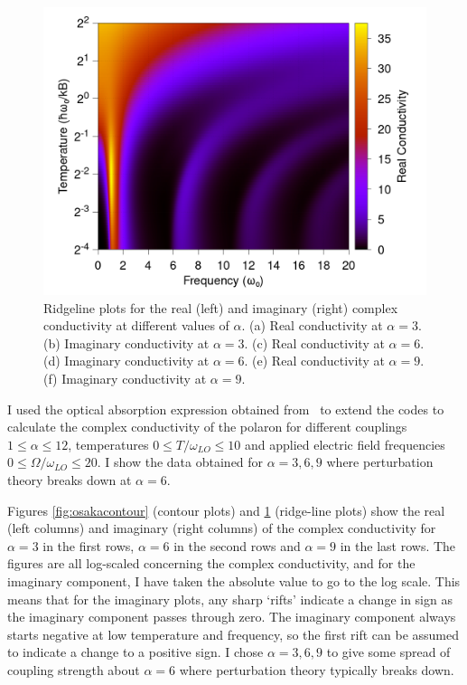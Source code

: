 \begin{figure}[t]
    \includegraphics[width=.49\textwidth]{figures/frohlich-3d-imag-memory-alpha-6-temp-00625to32-freq-0to30-contourf.png}

    \caption{Ridgeline plots for the real (left) and imaginary (right) complex conductivity at different values of $\alpha$. (a) Real conductivity at $\alpha = 3$. (b) Imaginary conductivity at $\alpha = 3$. (c) Real conductivity at $\alpha = 6$. (d) Imaginary conductivity at $\alpha = 6$. (e) Real conductivity at $\alpha = 9$. (f) Imaginary conductivity at $\alpha = 9$.}
    \label{fig:osakaridge}
\end{figure}

I used the optical absorption expression obtained from~\cite{devreese_optical_1972} to extend the codes to calculate the complex conductivity of the polaron for different couplings $1 \leq \alpha \leq 12$, temperatures $0 \leq T / \omega_{LO} \leq 10$ and applied electric field frequencies $0 \leq \Omega / \omega_{LO} \leq 20$. I show the data obtained for $\alpha = 3, 6, 9$ where perturbation theory breaks down at $\alpha = 6$. 

Figures \ref{fig:osakacontour} (contour plots) and \ref{fig:osakaridge} (ridge-line plots) show the real (left columns) and imaginary (right columns) of the complex conductivity for $\alpha = 3$ in the first rows, $\alpha = 6$ in the second rows and $\alpha = 9$ in the last rows. The figures are all log-scaled concerning the complex conductivity, and for the imaginary component, I have taken the absolute value to go to the log scale. This means that for the imaginary plots, any sharp `rifts' indicate a change in sign as the imaginary component passes through zero. The imaginary component always starts negative at low temperature and frequency, so the first rift can be assumed to indicate a change to a positive sign. I chose $\alpha = 3, 6, 9$ to give some spread of coupling strength about $\alpha = 6$ where perturbation theory typically breaks down. 

